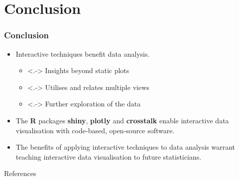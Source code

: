 \documentclass{beamer}
\begin{document}
\section{Conclusion}
\label{sec:conclusion}

\begin{frame}
\frametitle{Conclusion}
	\begin{itemize}[<+->]
		\item Interactive techniques benefit data analysis.
		\begin{itemize} 
			\item <.-> Insights beyond static plots
			\item <.-> Utilises and relates multiple views 
			\item <.-> Further exploration of the data
		\end{itemize}
		\item The \textbf{R} packages \textbf{shiny}, \textbf{plotly} and \textbf{crosstalk} enable interactive data visualisation with code-based, open-source software.
		\item The benefits of applying interactive techniques to data analysis warrant teaching interactive data visualisation to future statisticians.
	\end{itemize}
\end{frame}

\begin{frame}[allowframebreaks]{References}
	
	
	\nocite{R}
	\nocite{plotly_R}
	\nocite{crosstalk_R}
	\nocite{shiny_R}
\end{frame}
\end{document}
